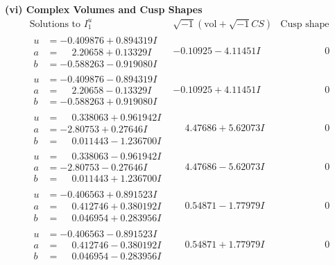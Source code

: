 \documentclass[1p]{elsarticle_modified}
\theoremstyle{definition}
\newcommand{\I}{\sqrt{-1}}
\begin{document}
\newpage\flushleft \textbf{(vi) Complex Volumes and Cusp Shapes}
$$\begin{array}{c|c|c}  
\text{Solutions to }I^u_{1}& \I (\text{vol} + \sqrt{-1}CS) & \text{Cusp shape}\\
 \hline 
\begin{aligned}
u &= -0.409876 + 0.894319 I \\
a &= \phantom{-}2.20658 + 0.13329 I \\
b &= -0.588263 - 0.919080 I\end{aligned}
 & -0.10925 - 4.11451 I & \phantom{-0.000000 } 0 \\ \hline\begin{aligned}
u &= -0.409876 - 0.894319 I \\
a &= \phantom{-}2.20658 - 0.13329 I \\
b &= -0.588263 + 0.919080 I\end{aligned}
 & -0.10925 + 4.11451 I & \phantom{-0.000000 } 0 \\ \hline\begin{aligned}
u &= \phantom{-}0.338063 + 0.961942 I \\
a &= -2.80753 + 0.27646 I \\
b &= \phantom{-}0.011443 - 1.236700 I\end{aligned}
 & \phantom{-}4.47686 + 5.62073 I & \phantom{-0.000000 } 0 \\ \hline\begin{aligned}
u &= \phantom{-}0.338063 - 0.961942 I \\
a &= -2.80753 - 0.27646 I \\
b &= \phantom{-}0.011443 + 1.236700 I\end{aligned}
 & \phantom{-}4.47686 - 5.62073 I & \phantom{-0.000000 } 0 \\ \hline\begin{aligned}
u &= -0.406563 + 0.891523 I \\
a &= \phantom{-}0.412746 + 0.380192 I \\
b &= \phantom{-}0.046954 + 0.283956 I\end{aligned}
 & \phantom{-}0.54871 - 1.77979 I & \phantom{-0.000000 } 0 \\ \hline\begin{aligned}
u &= -0.406563 - 0.891523 I \\
a &= \phantom{-}0.412746 - 0.380192 I \\
b &= \phantom{-}0.046954 - 0.283956 I\end{aligned}
 & \phantom{-}0.54871 + 1.77979 I & \phantom{-0.000000 } 0 \\ \hline\begin{aligned}

\end{aligned}
\end{array}$$
\end{document}

